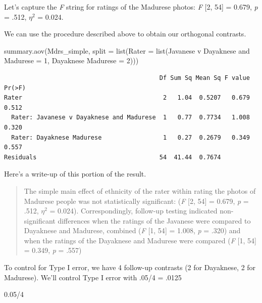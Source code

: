 \documentclass[
  11pt,
]{book}
\newenvironment{Shaded}{\begin{snugshade}}{\end{snugshade}}
\newcommand{\AttributeTok}[1]{\textcolor[rgb]{0.77,0.63,0.00}{#1}}
\newcommand{\DecValTok}[1]{\textcolor[rgb]{0.00,0.00,0.81}{#1}}
\newcommand{\FloatTok}[1]{\textcolor[rgb]{0.00,0.00,0.81}{#1}}
\newcommand{\FunctionTok}[1]{\textcolor[rgb]{0.00,0.00,0.00}{#1}}
\newcommand{\NormalTok}[1]{#1}
\newcommand{\OtherTok}[1]{\textcolor[rgb]{0.56,0.35,0.01}{#1}}
\newcommand{\SpecialCharTok}[1]{\textcolor[rgb]{0.00,0.00,0.00}{#1}}
\newcommand{\StringTok}[1]{\textcolor[rgb]{0.31,0.60,0.02}{#1}}
\begin{document}
Let's capture the \emph{F} string for ratings of the Madurese photos: \emph{F} {[}2, 54{]} = 0.679, \emph{p} = .512, \(\eta ^{2}\) = 0.024.

We can use the procedure described above to obtain our orthogonal contrasts.

\begin{Shaded}
\begin{Highlighting}[]
\FunctionTok{summary.aov}\NormalTok{(Mdrs\_simple, }\AttributeTok{split =} \FunctionTok{list}\NormalTok{(}\AttributeTok{Rater =} \FunctionTok{list}\NormalTok{(}\StringTok{\textasciigrave{}}\AttributeTok{Javanese v Dayaknese and Madurese}\StringTok{\textasciigrave{}} \OtherTok{=} \DecValTok{1}\NormalTok{,}
    \StringTok{\textasciigrave{}}\AttributeTok{Dayaknese Madurese}\StringTok{\textasciigrave{}} \OtherTok{=} \DecValTok{2}\NormalTok{)))}
\end{Highlighting}
\end{Shaded}

\begin{verbatim}
                                           Df Sum Sq Mean Sq F value Pr(>F)
Rater                                       2   1.04  0.5207   0.679  0.512
  Rater: Javanese v Dayaknese and Madurese  1   0.77  0.7734   1.008  0.320
  Rater: Dayaknese Madurese                 1   0.27  0.2679   0.349  0.557
Residuals                                  54  41.44  0.7674               
\end{verbatim}

Here's a write-up of this portion of the result.

\begin{quote}
The simple main effect of ethnicity of the rater within rating the photos of Madurese people was not statistically significant: (\emph{F} {[}2, 54{]} = 0.679, \emph{p} = .512, \(\eta ^{2}\) = 0.024). Correspondingly, follow-up testing indicated non-significant differences when the ratings of the Javanese were compared to Dayaknese and Madurese, combined (\emph{F} {[}1, 54{]} = 1.008, \emph{p} = .320) and when the ratings of the Dayaknese and Madurese were compared (\emph{F} {[}1, 54{]} = 0.349, \emph{p} = .557)
\end{quote}

To control for Type I error, we have 4 follow-up contrasts (2 for Dayaknese, 2 for Madurese). We'll control Type I error with .05/4 = .0125

\begin{Shaded}
\begin{Highlighting}[]
\FloatTok{0.05}\SpecialCharTok{/}\DecValTok{4}
\end{Highlighting}
\end{Shaded}
\end{document}
